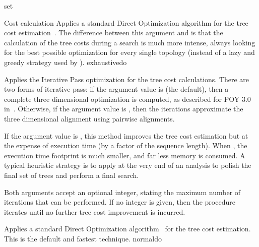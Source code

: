 \begin{command}{set}{}
\begin{arguments}
\begin{argumentgroup}{Cost calculation}
                {Applies a standard Direct Optimization algorithm for the tree
                cost estimation~\cite{wheeler1996,wheeler2002a}. The difference 
                between this argument and  is
                that the calculation of the tree costs during a search is much
                more intense, always looking for the best possible optimization 
                for every single topology (instead of a lazy and greedy strategy
                used by ).}
                {exhaustivedo}

                {Applies the Iterative Pass optimization for the tree cost
                calculations. There are two forms of iterative pass: if the
                argument value is  (the default), then a complete three
                dimensional optimization is computed, as described for POY 3.0 in~\cite{wheeler2003a}. 
                Otherwise, if the argument value is , then the iterations
                approximate the three dimensional alignment using pairwise
                alignments. 
               
                 \setlength{\parindent}{0.5cm}                                
                \indent
                    If the argument value is , this method improves the tree
                cost estimation but at the expense of execution time (by a factor of the sequence length).
                 When , the execution time footprint is much
                smaller, and far less memory is consumed.
                A typical heuristic strategy is to apply   at the 
                very end of an analysis to polish the final set of trees and perform a final search. 
               
                \setlength{\parindent}{0.5cm}                                
                \indent
                Both arguments accept an optional integer, stating the maximum
                number of iterations that can be performed. If no integer is
                given, then the procedure iterates until no further tree cost
                improvement is incurred.}
                {}
                
                {Applies a standard Direct Optimization algorithm~\cite{Varon2013} for the tree
                cost estimation. This is the default and fastest technique.}
                {normaldo}


\end{argumentgroup}
\end{arguments}
\end{command}
